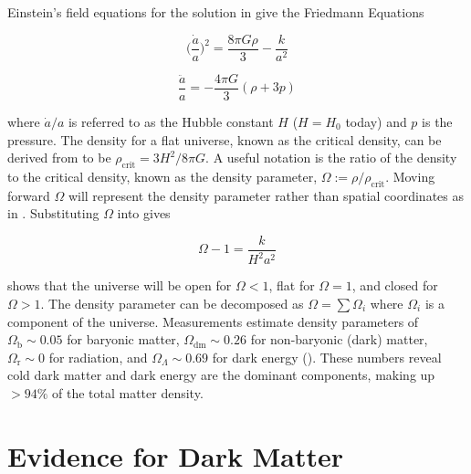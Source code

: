 Einstein's field equations for the solution in  give the Friedmann Equations

\begin{equation}
\bigg(\frac{\dot{a}}{a}\bigg)^{2} = \frac{8\pi G \rho}{3} - \frac{k}{a^{2}}
\label{eq:friedman1}
\end{equation}

\begin{equation}
\frac{\ddot{a}}{a} = -\frac{4\pi G}{3}(\rho + 3p)
\label{eq:friedman2}
\end{equation}

\noindent where $\dot{a}/a$ is referred to as the Hubble
constant $H$ ($H = H_{0}$ today) and $p$ is the pressure.  The density for a flat universe, known as the critical density, can be derived
from  to be $\rho_{\mathrm{crit}} = 3H^2 / 8\pi G$.  A useful
notation is the ratio of the density to the critical density, known as the density parameter,
$\Omega := \rho/\rho_{\mathrm{crit}}$.  Moving forward $\Omega$ will represent the density
parameter rather than spatial coordinates as in .  Substituting
$\Omega$ into  gives

\begin{equation}
\Omega - 1 = \frac{k}{H^{2}{a^{2}}}
\label{eq:dark_matter_lambda_cdm_dens_par}
\end{equation}

 shows that the universe will be open for $\Omega < 1$, flat for $\Omega = 1$, and
closed for $\Omega > 1$.  The density parameter can be decomposed as $\Omega = \sum \Omega_{i}$ where $\Omega_{i}$ is a component of the
universe.  Measurements estimate density parameters of $\Omega_{\mathrm{b}} \sim 0.05$ for baryonic matter,
$\Omega_{\mathrm{dm}} \sim 0.26$ for non-baryonic (dark)
matter, $\Omega_{\mathrm{r}} \sim 0$
for radiation, and $\Omega_{\Lambda} \sim 0.69$ for dark energy ().  These numbers reveal cold dark matter and dark
energy are the dominant components, making up $> 94\%$ of the total matter density.



\section[Evidence for Dark Matter][Evidence for Dark Matter]{Evidence for Dark Matter}
\label{sec:dark_matter_evidence}
